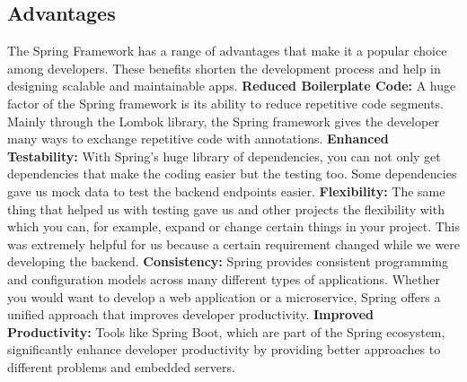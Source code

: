     \subsection{Advantages}
    The Spring Framework has a range of advantages that make it a popular choice among developers. These benefits shorten the development process and help in designing scalable and maintainable apps. \newline \newline
    \textbf{Reduced Boilerplate Code:} \newline 
    A huge factor of the Spring framework is its ability to reduce repetitive code segments. Mainly through the Lombok library, the Spring framework gives the developer many ways to exchange repetitive code with annotations. \newline  \newline
    \textbf{Enhanced Testability:} \newline
    With Spring's huge library of dependencies, you can not only get dependencies that make the coding easier but the testing too. Some dependencies gave us mock data to test the backend endpoints easier.\newline \newline
    \textbf{Flexibility:} \newline
    The same thing that helped us with testing gave us and other projects the flexibility with which you can, for example, expand or change certain things in your project. This was extremely helpful for us because a certain requirement changed while we were developing the backend.\newline \newline
    \textbf{Consistency:} \newline
    Spring provides consistent programming and configuration models across many different types of applications. Whether you would want to develop a web application or a microservice, Spring offers a unified approach that improves developer productivity.\newline \newline
    \textbf{Improved Productivity:} \newline
    Tools like Spring Boot, which are part of the Spring ecosystem, significantly enhance developer productivity by providing better approaches to different problems and embedded servers. \Autocite{Andi:SpringBoot2}
    
